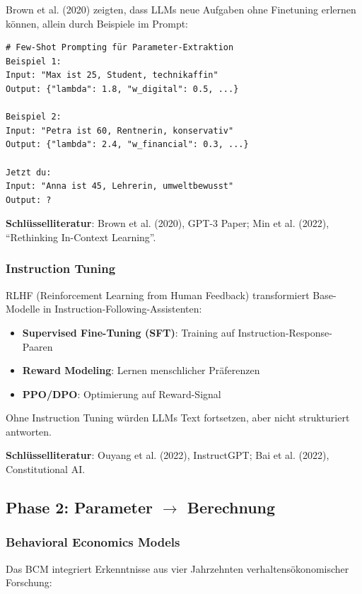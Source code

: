 \documentclass[12pt,a4paper]{article}
\begin{document}
Brown et al. (2020) zeigten, dass LLMs neue Aufgaben ohne Finetuning erlernen können, allein durch Beispiele im Prompt:

\begin{lstlisting}
# Few-Shot Prompting für Parameter-Extraktion
Beispiel 1:
Input: "Max ist 25, Student, technikaffin"
Output: {"lambda": 1.8, "w_digital": 0.5, ...}

Beispiel 2:
Input: "Petra ist 60, Rentnerin, konservativ"
Output: {"lambda": 2.4, "w_financial": 0.3, ...}

Jetzt du:
Input: "Anna ist 45, Lehrerin, umweltbewusst"
Output: ?
\end{lstlisting}

\textbf{Schlüsselliteratur}: Brown et al. (2020), GPT-3 Paper; Min et al. (2022), ``Rethinking In-Context Learning''.

\subsubsection{Instruction Tuning}

RLHF (Reinforcement Learning from Human Feedback) transformiert Base-Modelle in Instruction-Following-Assistenten:

\begin{itemize}
    \item \textbf{Supervised Fine-Tuning (SFT)}: Training auf Instruction-Response-Paaren
    \item \textbf{Reward Modeling}: Lernen menschlicher Präferenzen
    \item \textbf{PPO/DPO}: Optimierung auf Reward-Signal
\end{itemize}

Ohne Instruction Tuning würden LLMs Text fortsetzen, aber nicht strukturiert antworten.

\textbf{Schlüsselliteratur}: Ouyang et al. (2022), InstructGPT; Bai et al. (2022), Constitutional AI.

\subsection{Phase 2: Parameter $\rightarrow$ Berechnung}

\subsubsection{Behavioral Economics Models}

Das BCM integriert Erkenntnisse aus vier Jahrzehnten verhaltensökonomischer Forschung:
\end{document}

